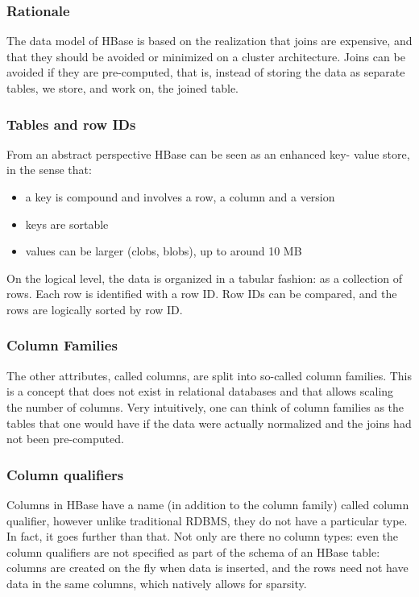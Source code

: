 \subsubsection{Rationale}
The data model of HBase is based on the realization that joins are expensive, and that they should be avoided or minimized on a cluster architecture. Joins can be avoided if they are pre-computed, that is, instead of storing the data as separate tables, we store, and work on, the joined table.

\subsubsection{Tables and row IDs}
From an abstract perspective HBase can be seen as an enhanced key- value store, in the sense that:
\begin{itemize}
    \item a key is compound and involves a row, a column and a version
    \item keys are sortable
    \item values can be larger (clobs, blobs), up to around 10 MB
\end{itemize}
On the logical level, the data is organized in a tabular fashion: as a collection of rows. Each row is identified with a row ID. Row IDs can be compared, and the rows are logically sorted by row ID.

\subsubsection{Column Families}
The other attributes, called columns, are split into so-called column families. This is a concept that does not exist in relational databases and that allows scaling the number of columns. Very intuitively, one can think of column families as the tables that one would have if the data were actually normalized and the joins had not been pre-computed.

\subsubsection{Column qualifiers}
Columns in HBase have a name (in addition to the column family) called column qualifier, however unlike traditional RDBMS, they do not have a particular type. In fact, it goes further than that. Not only are there no column types: even the column qualifiers are not specified as part of the schema of an HBase table: columns are created on the fly when data is inserted, and the rows need not have data in the same columns, which natively allows for sparsity.

